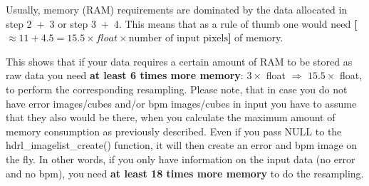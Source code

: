 Usually, memory (RAM) requirements are dominated by the data allocated in step 2~+~3  or step 3~+~4. This means that as a rule of thumb one would
need \textbf{[$\approx 11 + 4.5 = 15.5 \times float \times \mbox{number of input pixels}$]} of memory.

This shows that if your data requires a certain amount of RAM to be stored as
raw data you need \textbf{at
least 6 times more memory}: $3\times$ float $\Rightarrow$ $15.5 \times$
float, to perform the corresponding resampling. Please note, that in case you
do not have error images/cubes and/or bpm
images/cubes in input you have to assume that they also would be there, when you
calculate the maximum amount of memory consumption as previously described.
Even if you pass NULL to the hdrl\_imagelist\_create() function, it will
then create an error and bpm image on the fly. In other words, if you only have
information on the input data (no error and no bpm), you need
\textbf{at least 18 times more memory} to do the resampling.


